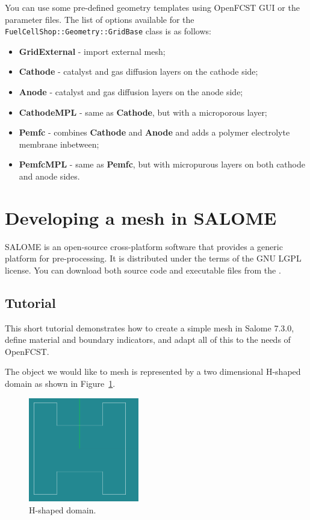 You can use some pre-defined geometry templates using OpenFCST GUI or the parameter files. The list of options available for the \texttt{FuelCellShop::Geometry::GridBase} class is as follows:
\begin{itemize}
\item \textbf{GridExternal} - import external mesh;
\item \textbf{Cathode} - catalyst and gas diffusion layers on the cathode side;
\item \textbf{Anode} - catalyst and gas diffusion layers on the anode side;
\item \textbf{CathodeMPL} - same as \textbf{Cathode}, but with a microporous layer;
\item \textbf{Pemfc} - combines \textbf{Cathode} and \textbf{Anode} and adds a polymer electrolyte membrane inbetween;
\item \textbf{PemfcMPL} - same as \textbf{Pemfc}, but with micropurous layers on both cathode and anode sides.
\end{itemize}

\section{Developing a mesh in SALOME}
SALOME is an open-source cross-platform software that provides a generic platform for pre-processing. It is distributed under the terms of the GNU LGPL license. You can download both source code and executable files from the .

\subsection{Tutorial}
This short tutorial demonstrates how to create a simple mesh in Salome 7.3.0, define material and boundary indicators, and adapt all of this to the needs of OpenFCST.

The object we would like to mesh is represented by a two dimensional H-shaped domain as shown in Figure~\ref{fig:no3.2.1.1}.

\begin{figure}[h!]
\begin{center}
\includegraphics[width=0.43\textwidth]{figures/salome0.png}
\caption{H-shaped domain.}
\label{fig:no3.2.1.1}
\end{center}
\end{figure}

